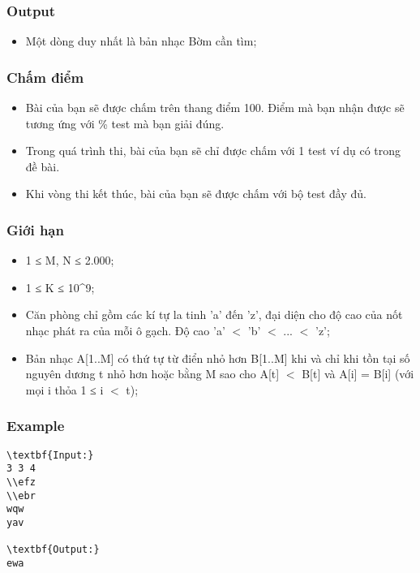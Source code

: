\subsubsection{   Output  }
\begin{itemize}
	\item     Một dòng duy nhất là bản nhạc Bờm cần tìm;   
\end{itemize}

\subsubsection{   Chấm điểm  }
\begin{itemize}
	\item     Bài của bạn sẽ được chấm trên thang điểm 100. Điểm mà bạn nhận được sẽ tương ứng với \% test mà bạn giải đúng.   
	\item     Trong quá trình thi, bài của bạn sẽ chỉ được chấm với 1 test ví dụ có trong đề bài.   
	\item     Khi vòng thi kết thúc, bài của bạn sẽ được chấm với bộ test đầy đủ.   
\end{itemize}

\subsubsection{   Giới hạn  }
\begin{itemize}
	\item     1 ≤ M, N ≤ 2.000;   
	\item     1 ≤ K ≤ 10^9;   
	\item     Căn phòng chỉ gồm các kí tự la tinh 'a' đến 'z', đại diện cho độ cao của nốt nhạc phát ra của mỗi ô gạch. Độ cao 'a' $<$ 'b' $<$ ... $<$ 'z';   
	\item     Bản nhạc A[1..M] có thứ tự từ điển nhỏ hơn B[1..M] khi và chỉ khi tồn tại số nguyên dương t nhỏ hơn hoặc bằng M sao cho A[t] $<$ B[t] và A[i] = B[i] (với mọi i thỏa 1 ≤ i $<$ t);   
\end{itemize}
\begin{itemize}
\end{itemize}

\subsubsection{   Example  }
\begin{verbatim}
\textbf{Input:}
3 3 4
\\efz
\\ebr
wqw
yav

\textbf{Output:}
ewa
\end{verbatim}
